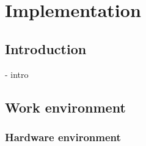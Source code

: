 

\chapter{Implementation}


\section{Introduction}
- intro

\section{Work environment}
    \subsection{Hardware environment}






